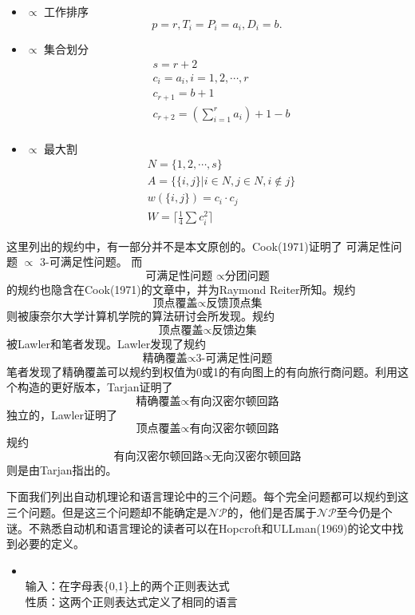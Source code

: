 \documentclass[twocolumn]{article}
\theoremstyle{nonumberplain}%
\begin{document}
\begin{CJK}{UTF8}{gbsn}
\begin{itemize}
    \item { $\propto$ 工作排序}
        $$p=r, T_i=P_i=a_i, D_i=b.$$

    \item { $\propto$ 集合划分}
        \begin{equation}\nonumber %
        \begin{aligned}
        &s=r+2\\
        &c_i=a_i,i=1,2,\cdots,r\\
        &c_{r+1}=b+1\\
        &c_{r+2}=(\sum_{i=1}^{r}a_i)+1-b\\
        \end{aligned}
        \end{equation}

    \item { $\propto$ 最大割}
        \begin{equation}\nonumber %
        \begin{aligned}
        &N=\{1,2,\cdots,s\}\\
        &A=\{\{i,j\}|i\in N,j\in N,i\notin j\}\\
        &w(\{i,j\})=c_i\cdot c_j\\
        &W=\lceil \frac14\sum c_i^2\rceil
        \end{aligned}
        \end{equation}

    \end{itemize}
    这里列出的规约中，有一部分并不是本文原创的。Cook(1971)证明了 可满足性问题 $\propto$ 3-可满足性问题。 而
    $$\text{可满足性问题 }\propto \text{分团问题}$$
    的规约也隐含在Cook(1971)的文章中，并为Raymond Reiter所知。规约$$ \text{顶点覆盖}\propto\text{反馈顶点集}$$则被康奈尔大学计算机学院的算法研讨会所发现。规约$$ \text{顶点覆盖}\propto\text{反馈边集}$$ 被Lawler和笔者发现。Lawler发现了规约
    $$\text{精确覆盖}\propto\text{3-可满足性问题}$$笔者发现了精确覆盖可以规约到权值为0或1的有向图上的有向旅行商问题。利用这个构造的更好版本，Tarjan证明了$$\text{精确覆盖}\propto\text{有向汉密尔顿回路}$$独立的，Lawler证明了$$\text{顶点覆盖}\propto\text{有向汉密尔顿回路}$$规约$$\text{有向汉密尔顿回路}\propto\text{无向汉密尔顿回路}$$则是由Tarjan指出的。

    下面我们列出自动机理论和语言理论中的三个问题。每个完全问题都可以规约到这三个问题。但是这三个问题却不能确定是$\mathcal{NP}$的，他们是否属于$\mathcal{NP}$至今仍是个谜。不熟悉自动机和语言理论的读者可以在Hopcroft和ULLman(1969)的论文中找到必要的定义。
    \begin{itemize}
      \item {}\\
      输入：在字母表\{0,1\}上的两个正则表达式\\
      性质：这两个正则表达式定义了相同的语言


\end{itemize}
\end{CJK}
\end{document}
